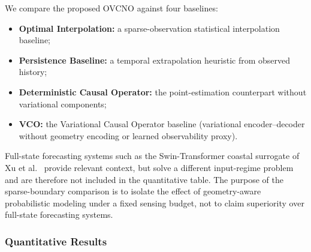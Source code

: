 \documentclass[11pt,a4paper]{article}
\begin{document}
We compare the proposed OVCNO against four baselines:
\begin{itemize}
    \item \textbf{Optimal Interpolation:} a sparse-observation statistical interpolation baseline;
    \item \textbf{Persistence Baseline:} a temporal extrapolation heuristic from observed history;
    \item \textbf{Deterministic Causal Operator:} the point-estimation counterpart without variational components;
    \item \textbf{VCO:} the Variational Causal Operator baseline (variational encoder--decoder without geometry encoding or learned observability proxy).
\end{itemize}

Full-state forecasting systems such as the Swin-Transformer coastal surrogate of Xu et al.~\cite{xu2024coastal} provide relevant context, but solve a different input-regime problem and are therefore not included in the quantitative table. The purpose of the sparse-boundary comparison is to isolate the effect of geometry-aware probabilistic modeling under a fixed sensing budget, not to claim superiority over full-state forecasting systems.

\subsubsection{Quantitative Results}

\begin{table}[!htbp]
\centering
\caption{Results on the Copernicus SSH Gulf of Tonkin applied validation OSSE. The proposed OVCNO is compared under the same sparse boundary sensing budget as the sparse-sensor baselines.}
\label{tab:copernicus_results}
\vspace{4pt}
\end{table}
\end{document}
